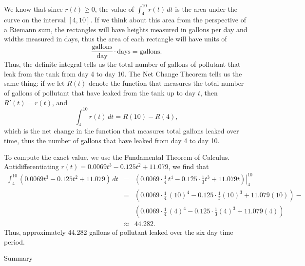 \begin{solution}
We know that since $r(t) \ge 0$, the value of $\int_4^{10} r(t) \, dt$ is the area under the curve on the interval $[4,10]$.  If we think about this area from the perspective of a Riemann sum, the rectangles will have heights measured in gallons per day and widths measured in days, thus the area of each rectangle will have units of
$$\frac{\mbox{gallons}}{\mbox{day}} \cdot \mbox{days} = \mbox{gallons}.$$
Thus, the definite integral tells us the total number of gallons of pollutant that leak from the tank from day 4 to day 10.  The Net Change Theorem tells us the same thing:  if we let $R(t)$ denote the function that measures the total number of gallons of pollutant that have leaked from the tank up to day $t$, then $R'(t) = r(t)$, and 
$$\int_4^{10} r(t) \, dt = R(10) - R(4),$$
which is the net change in the function that measures total gallons leaked over time, thus the number of gallons that have leaked from day 4 to day 10.

To compute the exact value, we use the Fundamental Theorem of Calculus.  Antidifferentiating $r(t) = 0.0069t^3 -0.125t^2+11.079$, we find that
\begin{eqnarray*}
	\int_4^{10} (0.0069t^3 -0.125t^2+11.079) \, dt & = & \left. \left( 0.0069 \cdot \frac{1}{4} \, t^4 - 0.125 \cdot \frac{1}{3} t^3 + 11.079t \right) \right|_4^{10} \\
			& = & \left( 0.0069 \cdot \frac{1}{4} \, (10)^4 - 0.125 \cdot \frac{1}{3} (10)^3 + 11.079(10) \right) - \\
			& \ &  \left( 0.0069 \cdot \frac{1}{4} \, (4)^4 - 0.125 \cdot \frac{1}{3} (4)^3 + 11.079(4) \right) \\
			& \approx & 44.282. 
\end{eqnarray*}
Thus, approximately 44.282 gallons of pollutant leaked over the six day time period.

\end{solution}






Summary

